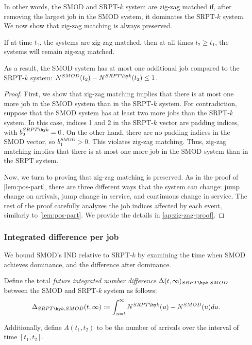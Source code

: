 \documentclass[acmsmall]{acmart}
\begin{document}
In other words, the SMOD and SRPT-$k$ system are zig-zag matched if, after removing the largest job in the SMOD system, it dominates the SRPT-$k$ system. 
We now show that zig-zag matching is always preserved.

\begin{lemma}
    \label{lem:zig-zag}
    If at time $t_1$, the systems are zig-zag matched,
    then at all times $t_2 \ge t_1$, the systems will remain zig-zag matched.

    As a result, the SMOD system has at most one additional job compared to the SRPT-$k$ system: $N^{SMOD}(t_2) - N^{SRPT\hy k}(t_2) \le 1$.
\end{lemma}


\begin{proof}
    First, we show that zig-zag matching implies that there is at most one more job in the SMOD system than in the SRPT-$k$ system.
    For contradiction, suppose that the SMOD system has at least two more jobs than the SRPT-$k$ system.
    In this case, indices 1 and 2 in the SRPT-$k$ vector are padding indices, with $b^{SRPT\hy k}_2 = 0$.
    On the other hand, there are no padding indices in the SMOD vector,
    so $b^{SMOD}_1 > 0$. This violates zig-zag matching.
    Thus, zig-zag matching implies that there is at most one more job in the SMOD system than in the SRPT system.

    Now, we turn to proving that zig-zag matching is preserved.
    As in the proof of \cref{lem:pos-part},
    there are three different ways that the system can change: jump change on arrivals, jump change in service, and continuous change in service. The rest of the proof carefully analyzes the job indices affected by each event, similarly to \cref{lem:pos-part}. We provide the details in \cref{ap:zig-zag-proof}.
\end{proof}


\subsubsection{Integrated difference per job}
\label{sec:diff-per-job}

We bound SMOD's IND relative to SRPT-$k$ by examining the time when SMOD achieves dominance, and the difference after dominance.

\begin{definition}\label{def:future-IND}
    Define the total \textit{future integrated number difference} $\Delta(t, \infty)_{SRPT\hy k, SMOD}$ between the SMOD and SRPT-$k$ system as follows:
    \begin{align*}
        \Delta_{SRPT\hy k, SMOD}(t, \infty) := \int_{u=t}^\infty N^{SRPT\hy k}(u) - N^{SMOD}(u) du.
    \end{align*}

    Additionally, define $A(t_1, t_2)$ to be the number of arrivals over the interval of time $[t_1, t_2]$.
\end{definition}
\end{document}

